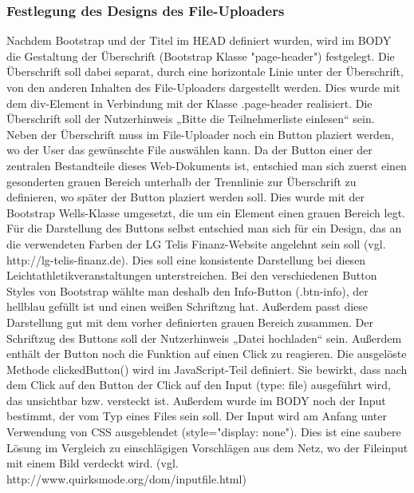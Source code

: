 {\subsubsection{Festlegung des Designs des File-Uploaders}
Nachdem Bootstrap und der Titel im HEAD definiert wurden, wird im BODY die Gestaltung der Überschrift (Bootstrap Klasse "page-header") festgelegt. Die Überschrift soll dabei separat, durch eine horizontale Linie unter der Überschrift, von den anderen Inhalten des File-Uploaders dargestellt werden. Dies wurde mit dem div-Element in Verbindung mit der Klasse .page-header realisiert. Die Überschrift soll der Nutzerhinweis „Bitte die Teilnehmerliste einlesen“ sein.
Neben der Überschrift muss im File-Uploader noch ein Button plaziert werden, wo der User das gewünschte File auswählen kann. Da der Button einer der zentralen Bestandteile dieses Web-Dokuments ist, entschied man sich zuerst einen gesonderten grauen Bereich unterhalb der Trennlinie zur Überschrift zu definieren, wo später der Button plaziert werden soll. Dies wurde mit der Bootstrap Wells-Klasse umgesetzt, die um ein Element einen grauen Bereich legt. 
Für die Darstellung des Buttons selbst entschied man sich für ein Design, das an die verwendeten Farben der LG Telis Finanz-Website angelehnt sein soll (vgl. http://lg-telis-finanz.de). Dies soll eine konsistente Darstellung bei diesen Leichtathletikveranstaltungen unterstreichen. Bei den verschiedenen Button Styles von Bootstrap wählte man deshalb den Info-Button (.btn-info), der hellblau gefüllt ist und einen weißen Schriftzug hat. Außerdem passt diese Darstellung gut mit dem vorher definierten grauen Bereich zusammen. Der Schriftzug des Buttons soll der Nutzerhinweis „Datei hochladen“ sein. Außerdem enthält der Button noch die Funktion auf einen Click zu reagieren. Die ausgelöste Methode clickedButton() wird im JavaScript-Teil definiert. Sie bewirkt, dass nach dem Click auf den Button der Click auf den Input (type: file) ausgeführt wird, das unsichtbar bzw. versteckt ist.
Außerdem wurde im BODY noch der Input bestimmt, der vom Typ eines Files sein soll. Der Input wird am Anfang unter Verwendung von CSS ausgeblendet (style="display: none"). Dies ist eine saubere Lösung im Vergleich zu einschlägigen Vorschlägen aus dem Netz, wo der Fileinput mit einem Bild verdeckt wird. (vgl. http://www.quirksmode.org/dom/inputfile.html)

}
